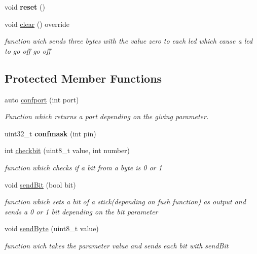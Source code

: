 \begin{DoxyCompactItemize}
\mbox{\label{class_new__ledsticklib_a9fa8ea107562835caa64fc51a265aec0}} 
void {\bfseries reset} ()
\item 
\mbox{\label{class_new__ledsticklib_a57a5c7c912609f1bd79cfbccb62e7e87}} 
void \mbox{\hyperlink{class_new__ledsticklib_a57a5c7c912609f1bd79cfbccb62e7e87}{clear}} () override
\begin{DoxyCompactList}\small\item\em function wich sends three bytes with the value zero to each led which cause a led to go off go off \end{DoxyCompactList}\end{DoxyCompactItemize}
\subsection*{Protected Member Functions}
\begin{DoxyCompactItemize}
\item 
auto \mbox{\hyperlink{class_new__ledsticklib_aa6300ac04c675a3e4b2c21ae2ef83af7}{confport}} (int port)
\begin{DoxyCompactList}\small\item\em Function which returns a port depending on the giving parameter. \end{DoxyCompactList}\item 
\mbox{\label{class_new__ledsticklib_a9d73e4f932db02b0de3deef3c08a1573}} 
uint32\+\_\+t {\bfseries confmask} (int pin)
\item 
int \mbox{\hyperlink{class_new__ledsticklib_a8454428b9f9401eb1c7b93a006326a45}{checkbit}} (uint8\+\_\+t value, int number)
\begin{DoxyCompactList}\small\item\em function which checks if a bit from a byte is 0 or 1 \end{DoxyCompactList}\item 
void \mbox{\hyperlink{class_new__ledsticklib_a2c960f7c1f576f088cafe0b1c9630c86}{send\+Bit}} (bool bit)
\begin{DoxyCompactList}\small\item\em function which sets a bit of a stick(depending on fush function) as output and sends a 0 or 1 bit depending on the bit parameter \end{DoxyCompactList}\item 
void \mbox{\hyperlink{class_new__ledsticklib_a5c81be40c96d7fd3eaf6a4d7589b66dc}{send\+Byte}} (uint8\+\_\+t value)
\begin{DoxyCompactList}\small\item\em function wich takes the parameter value and sends each bit with send\+Bit \end{DoxyCompactList}\end{DoxyCompactItemize}
